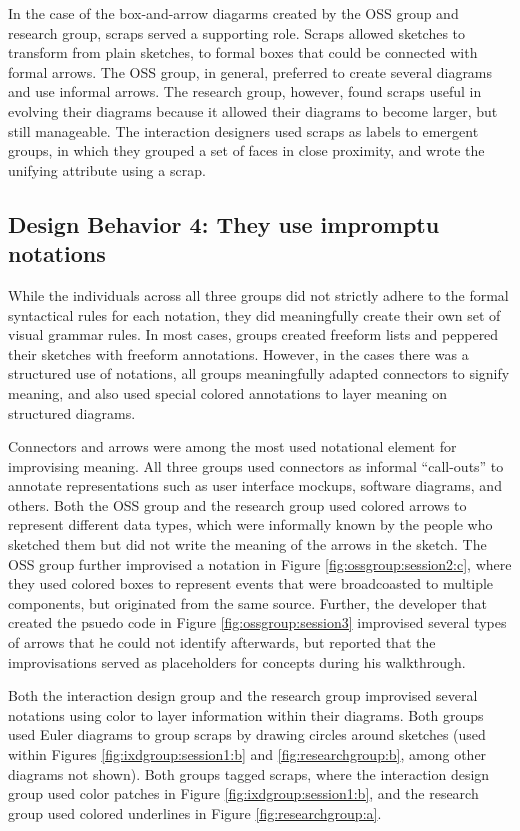 In the case of the box-and-arrow diagarms created by the OSS group and research group, scraps served a supporting role. Scraps allowed sketches to transform from plain sketches, to formal boxes that could be connected with formal arrows. The OSS group, in general, preferred to create several diagrams and use informal arrows. The research group, however, found scraps useful in evolving their diagrams because it allowed their diagrams to become larger, but still manageable. The interaction designers used scraps as labels to emergent groups, in which they grouped a set of faces in close proximity, and wrote the unifying attribute using a scrap.

\subsection{Design Behavior 4: They use impromptu notations}

While the individuals across all three groups did not strictly adhere to the formal syntactical rules for each notation, they did meaningfully create their own set of visual grammar rules. In most cases, groups created freeform lists and peppered their sketches with freeform annotations. However, in the cases there was a structured use of notations, all groups meaningfully adapted connectors to signify meaning, and also used special colored annotations to layer meaning on structured diagrams.

Connectors and arrows were among the most used notational element for improvising meaning. All three groups used connectors as informal ``call-outs'' to annotate representations such as user interface mockups, software diagrams, and others. Both the OSS group and the research group used colored arrows to represent different data types, which were informally known by the people who sketched them but did not write the meaning of the arrows in the sketch. The OSS group further improvised a notation in Figure \ref{fig:ossgroup:session2:c}, where they used colored boxes to represent events that were broadcoasted to multiple components, but originated from the same source. Further, the developer that created the psuedo code in Figure \ref{fig:ossgroup:session3} improvised several types of arrows that he could not identify afterwards, but reported that the improvisations served as placeholders for concepts during his walkthrough.

Both the interaction design group and the research group improvised several notations using color to layer information within their diagrams. Both groups used Euler diagrams to group scraps by drawing circles around sketches (used within Figures \ref{fig:ixdgroup:session1:b} and \ref{fig:researchgroup:b}, among other diagrams not shown). Both groups tagged scraps, where the interaction design group used color patches in Figure \ref{fig:ixdgroup:session1:b}, and the research group used colored underlines in Figure \ref{fig:researchgroup:a}.

